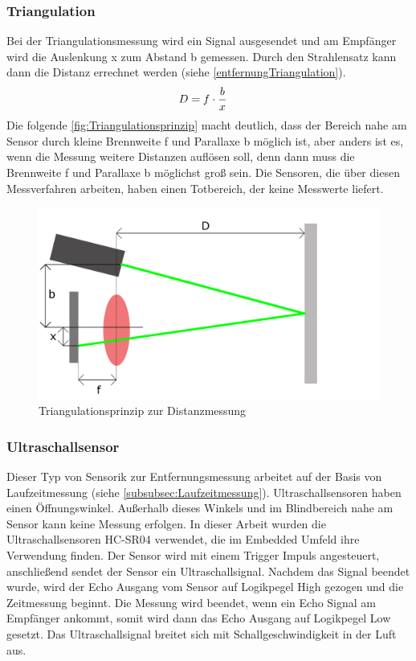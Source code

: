 \subsubsection{Triangulation}\label{subsubsec:Triangulation}
Bei der Triangulationsmessung wird ein Signal ausgesendet und am Empfänger wird die Auslenkung x zum Abstand b gemessen. Durch den Strahlensatz kann dann die Distanz errechnet werden (siehe \autoref{entfernungTriangulation}). \begin{align}
\centering
D &= f\cdot\dfrac{b}{x} \label{entfernungTriangulation}
\end{align}
Die folgende \autoref{fig:Triangulationsprinzip} macht deutlich, dass der Bereich nahe am Sensor durch kleine Brennweite f und Parallaxe b möglich ist, aber anders ist es, wenn die Messung weitere Distanzen auflösen soll, denn dann muss die Brennweite f und Parallaxe b möglichst groß sein. Die Sensoren, die über diesen Messverfahren arbeiten, haben einen Totbereich, der keine Messwerte liefert.\cite[S.38f]{RobotikSichtInformatik.2012}
\begin{figure}[H]
 \centering
 \includegraphics[width=0.98\linewidth]{Bilder/Grundlagen/Triangulationsprinzip.png}
 \caption{Triangulationsprinzip zur Distanzmessung}
 \label{fig:Triangulationsprinzip}
\end{figure}


\subsubsection{Ultraschallsensor}
Dieser Typ von Sensorik zur Entfernungsmessung arbeitet auf der Basis von Laufzeitmessung (siehe \autoref{subsubsec:Laufzeitmessung}). Ultraschallsensoren haben einen Öffnungswinkel. Außerhalb dieses Winkels und im Blindbereich nahe am Sensor kann keine Messung erfolgen. In dieser Arbeit wurden die Ultraschallsensoren HC-SR04 verwendet, die im Embedded Umfeld ihre Verwendung finden. 
Der Sensor wird mit einem Trigger Impuls angesteuert, anschließend sendet der Sensor ein Ultraschallsignal. Nachdem das Signal beendet wurde, wird der Echo Ausgang vom Sensor auf Logikpegel High gezogen und die Zeitmessung beginnt. Die Messung wird beendet, wenn ein Echo Signal am Empfänger ankommt, somit wird dann das Echo Ausgang auf Logikpegel Low gesetzt. Das Ultraschallsignal breitet sich mit Schallgeschwindigkeit in der Luft aus. 

